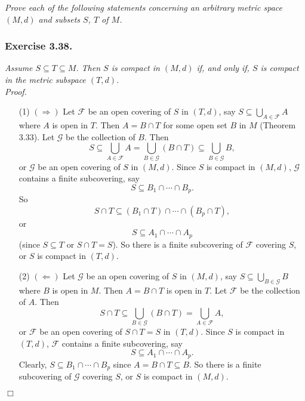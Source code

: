 \documentclass{article}
\begin{document}
\emph{Prove each of the following statements concerning an arbitrary metric space
$(M,d)$ and subsets $S$, $T$ of $M$.} \\



\subsubsection*{Exercise 3.38.}
\emph{Assume $S \subseteq T \subseteq M$.
Then $S$ is compact in $(M,d)$ if, and only if,
$S$ is compact in the metric subspace $(T,d)$. } \\

\emph{Proof.}
\begin{enumerate}
\item[(1)]
$(\Longrightarrow)$
Let $\mathscr{F}$ be an open covering of $S$ in $(T,d)$, say
$S \subseteq \bigcup_{A \in \mathscr{F}} A$ where $A$ is open in $T$.
Then $A = B \cap T$ for some open set $B$ in $M$ (Theorem 3.33).
Let $\mathscr{G}$ be the collection of $B$.
Then
$$S \subseteq
\bigcup_{A \in \mathscr{F}} A
= \bigcup_{B \in \mathscr{G}} (B \cap T)
\subseteq \bigcup_{B \in \mathscr{G}} B,$$
or $\mathscr{G}$ be an open covering of $S$ in $(M,d)$.
Since $S$ is compact in $(M,d)$,
$\mathscr{G}$ contains a finite subcovering, say
$$S \subseteq B_1 \cap \cdots \cap B_p.$$
So $$S \cap T \subseteq (B_1\cap T) \cap \cdots \cap (B_p \cap T),$$
or $$S \subseteq A_1 \cap \cdots \cap A_p$$ (since $S \subseteq T$ or $S \cap T = S$).
So there is a finite subcovering of $\mathscr{F}$ covering $S$,
or $S$ is compact in $(T,d)$.
\item[(2)]
$(\Longleftarrow)$
Let $\mathscr{G}$ be an open covering of $S$ in $(M,d)$, say
$S \subseteq \bigcup_{B \in \mathscr{G}} B$ where $B$ is open in $M$.
Then $A = B \cap T$ is open in $T$.
Let $\mathscr{F}$ be the collection of $A$.
Then
$$S \cap T \subseteq
\bigcup_{B \in \mathscr{G}} (B \cap T)
= \bigcup_{A \in \mathscr{F}} A,$$
or $\mathscr{F}$ be an open covering of $S \cap T = S$ in $(T,d)$.
Since $S$ is compact in $(T,d)$,
$\mathscr{F}$ contains a finite subcovering, say
$$S \subseteq A_1 \cap \cdots \cap A_p.$$
Clearly, $S \subseteq B_1 \cap \cdots \cap B_p$ since $A = B \cap T \subseteq B$.
So there is a finite subcovering of $\mathscr{G}$ covering $S$,
or $S$ is compact in $(M,d)$.
\end{enumerate}
$\Box$ \\\\
\end{document}

